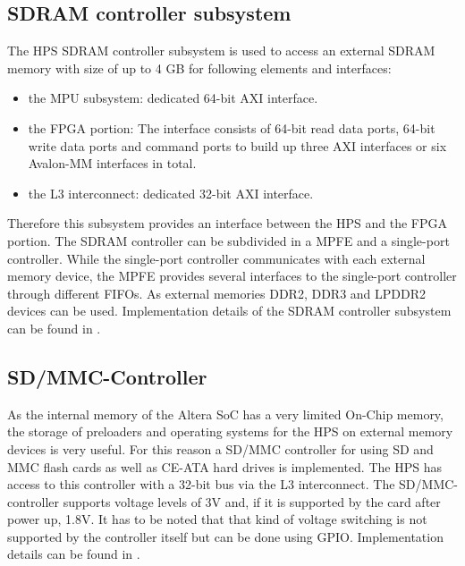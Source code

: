 \subsection{SDRAM controller subsystem}
The HPS SDRAM controller subsystem is used to access an external SDRAM memory with size of up to 4 GB for following elements and interfaces:
\begin{itemize}
\item the MPU subsystem: dedicated 64-bit AXI interface.
\item the FPGA portion: The interface consists of 64-bit read data ports, 64-bit write data ports and command ports to build up three AXI interfaces or six Avalon-MM interfaces in total.
\item the L3 interconnect: dedicated 32-bit AXI interface.
\end{itemize}
Therefore this subsystem provides an interface between the HPS and the FPGA portion. The SDRAM controller can be subdivided in a MPFE and a single-port controller. While the single-port controller communicates with each external memory device, the MPFE provides several interfaces to the single-port controller through different FIFOs. As external memories DDR2, DDR3 and LPDDR2 devices can be used. Implementation details of the SDRAM controller subsystem can be found in \cite[chapter 11]{AlteraHPS15}.
\subsection{SD/MMC-Controller}
As the internal memory of the Altera SoC has a very limited On-Chip memory, the storage of preloaders and operating systems for the HPS on external memory devices is very useful. For this reason a SD/MMC controller for using SD and MMC flash cards as well as CE-ATA hard drives is implemented. The HPS has access to this controller with a 32-bit bus via the L3 interconnect. The SD/MMC-controller supports voltage levels of 3V and, if it is supported by the card after power up, 1.8V. It has to be noted that that kind of voltage switching is not supported by the controller itself but can be done using GPIO. Implementation details can be found in \cite[chapter 14]{AlteraHPS15}.
